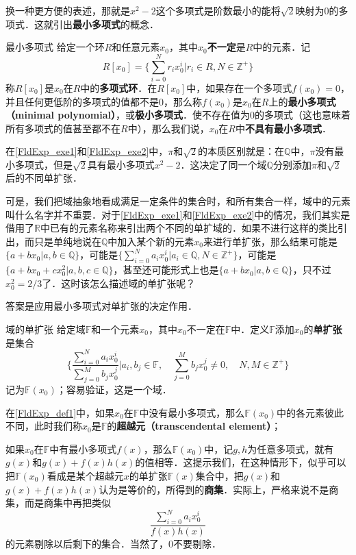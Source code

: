 换一种更方便的表述，那就是$x^2-2$这个多项式是阶数最小的能将$\sqrt{2}$映射为$0$的多项式．这就引出\textbf{最小多项式}的概念．

\begin{definition}{最小多项式}
给定一个环$R$和任意元素$x_0$，其中$x_0$\textbf{不一定}是$R$中的元素．记
$$R[x_0]=\{\sum_{i=0}^N r_ix_0^i|r_i\in R, N\in\mathbb{Z}^+\}$$称$R[x_0]$是$x_0$在$R$中的\textbf{多项式环}．在$R[x_0]$中，如果存在一个多项式$f(x_0)=0$，并且任何更低阶的多项式的值都不是$0$，那么称$f(x_0)$是$x_0$在$R$上的\textbf{最小多项式（minimal polynomial）}，或\textbf{极小多项式}．使不存在值为$0$的多项式（这也意味着所有多项式的值甚至都不在$R$中），那么我们说，$x_0$在$R$中\textbf{不具有最小多项式}．
\end{definition}

在\autoref{FldExp_exe1}和\autoref{FldExp_exe2}中，$\pi$和$\sqrt{2}$的本质区别就是：在$\mathbb{Q}$中，$\pi$没有最小多项式，但是$\sqrt{2}$具有最小多项式$x^2-2$．这决定了同一个域$\mathbb{Q}$分别添加$\pi$和$\sqrt{2}$后的不同单扩张．

可是，我们把域抽象地看成满足一定条件的集合时，和所有集合一样，域中的元素叫什么名字并不重要．对于\autoref{FldExp_exe1}和\autoref{FldExp_exe2}中的情况，我们其实是借用了$\mathbb{R}$中已有的元素名称来引出两个不同的单扩域的．如果不进行这样的类比引出，而只是单纯地说在$\mathbb{Q}$中加入某个新的元素$x_0$来进行单扩张，那么结果可能是$\{a+bx_0|a, b\in\mathbb{Q}\}$，可能是$\{\sum_{i=0}^N a_ix_0^i|a_i\in\mathbb{Q}, N\in\mathbb{Z}^+\}$，可能是$\{a+bx_0+cx_0^2|a, b, c\in\mathbb{Q}\}$，甚至还可能形式上也是$\{a+bx_0|a, b\in\mathbb{Q}\}$，只不过$x_0^2=2/3$了．这时该怎么描述域的单扩张呢？

答案是应用最小多项式对单扩张的决定作用．

\begin{definition}{域的单扩张}\label{FldExp_def1}
给定域$\mathbb{F}$和一个元素$x_0$，其中$x_0$不一定在$\mathbb{F}$中．定义$\mathbb{F}$添加$x_0$的\textbf{单扩张}是集合
\begin{equation}
\{\frac{\sum_{i=0}^N a_ix_0^i}{\sum_{j=0}^M b_jx_0^j}|a_i, b_j\in\mathbb{F},\quad\sum_{j=0}^M b_jx_0^j\not=0,\quad N, M\in\mathbb{Z}^+\}
\end{equation}
记为$\mathbb{F}(x_0)$；容易验证，这是一个域．
\end{definition}

在\autoref{FldExp_def1}中，如果$x_0$在$\mathbb{F}$中没有最小多项式，那么$\mathbb{F}(x_0)$中的各元素彼此不同，此时我们称$x_0$是$\mathbb{F}$的\textbf{超越元（transcendental element）}； 

如果$x_0$在$\mathbb{F}$中有最小多项式$f(x)$，那么$\mathbb{F}(x_0)$中，记$g, h$为任意多项式，就有$g(x)$和$g(x)+f(x)h(x)$的值相等．这提示我们，在这种情形下，似乎可以把$\mathbb{F}(x_0)$看成是某个超越元$x$的单扩张$\mathbb{F}(x)$集合中，把$g(x)$和$g(x)+f(x)h(x)$认为是等价的，所得到的\textbf{商集}．实际上，严格来说不是商集，而是商集中再把类似$$\frac{\sum_{i=0}^N a_ix_0^i}{f(x)h(x)}$$的元素剔除以后剩下的集合．当然了，$0$不要剔除．




